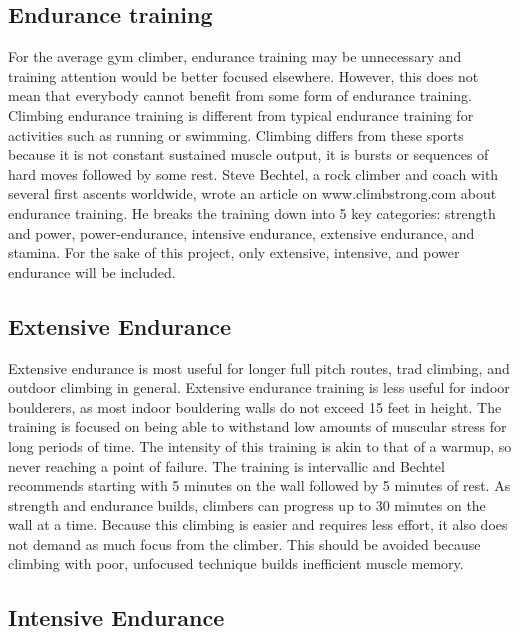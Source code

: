\documentclass[10pt,twocolumn]{article}
\begin{document}
\subsection{Endurance training}

	For the average gym climber, endurance training may be unnecessary and training attention would be better focused elsewhere. However, this does not mean that everybody cannot benefit from some form of endurance training. Climbing endurance training is different from typical endurance training for activities such as running or swimming. Climbing differs from these sports because it is not constant sustained muscle output, it is bursts or sequences of hard moves followed by some rest. Steve Bechtel, a rock climber and coach with several first ascents worldwide, wrote an article on www.climbstrong.com about endurance training. He breaks the training down into 5 key categories: strength and power, power-endurance, intensive endurance, extensive endurance, and stamina. For the sake of this project, only extensive, intensive, and power endurance will be included. \cite{bechtel_endurance_2017}

\subsection{Extensive Endurance}

	Extensive endurance is most useful for longer full pitch routes, trad climbing, and outdoor climbing in general. Extensive endurance training is less useful for indoor boulderers, as most indoor bouldering walls do not exceed 15 feet in height. The training is focused on being able to withstand low amounts of muscular stress for long periods of time. The intensity of this training is akin to that of  a warmup, so never reaching a point of failure. The training is intervallic and Bechtel recommends starting with 5 minutes on the wall followed by 5 minutes of rest. As strength and endurance builds, climbers can progress up to 30 minutes on the wall at a time. Because this climbing is easier and requires less effort, it also does not demand as much focus from the climber. This should be avoided because climbing with poor, unfocused technique builds inefficient muscle memory. \cite{bechtel_endurance_2017}

\subsection{Intensive Endurance}
\end{document}
